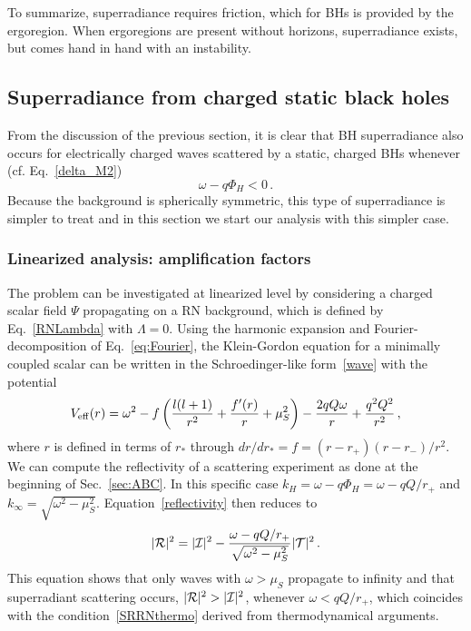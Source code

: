 \documentclass[11pt]{article}
\numberwithin{equation}{section} %
\begin{document}
To summarize, superradiance requires friction, which for BHs is provided by the ergoregion. When ergoregions are present without horizons, superradiance exists, but comes hand in hand with an instability.
\subsection{Superradiance from charged static black holes}\label{sec:superradiance_charged}
From the discussion of the previous section, it is clear that BH superradiance also occurs for electrically charged waves scattered by a static, charged BHs whenever (cf. Eq.~\eqref{delta_M2})
%
\begin{equation}
\omega-q\Phi_H<0\,. \label{SRRNthermo}
\end{equation}
%
Because the background is spherically symmetric, this type of superradiance is simpler to treat and in this section we start our analysis with this simpler case.
%
\subsubsection{Linearized analysis: amplification factors}
The problem can be investigated at linearized level by considering a charged scalar field $\Psi$ propagating on a RN 
background, which is defined by Eq.~\eqref{RNLambda} with $\Lambda=0$. Using the harmonic expansion and 
Fourier-decomposition of Eq.~\eqref{eq:Fourier}, the Klein-Gordon equation for a minimally coupled scalar can be written 
in the Schroedinger-like form~\eqref{wave} with the potential
%
\begin{equation}
V_{\rm eff}(r)=\omega^2-f\left(\frac{l(l+1)}{r^2}+\frac{f'(r)}{r}+\mu_S^2\right)-\frac{2qQ\omega}{r}+\frac{q^2Q^2}{r^2}\,,\label{VRN}
\end{equation}
%
where $r$ is defined in terms of $r_*$ through $dr/dr_*=f=(r-r_+)(r-r_-)/r^2$.
We can compute the reflectivity of a scattering experiment as done at the beginning of Sec.~\ref{sec:ABC}. In this specific case $k_H=\omega-q\Phi_H=\omega-qQ/r_+$ and $k_\infty=\sqrt{\omega^2-\mu_S^2}$. Equation~\eqref{reflectivity} then reduces to
\begin{equation}
 |{\cal R}|^2=|{\cal I}|^2-\frac{\omega-qQ/r_+}{\sqrt{\omega^2-\mu_S^2}}|{\cal T}|^2\,.\label{reflectivityRN}
\end{equation}
This equation shows that only waves with $\omega>\mu_S$ propagate to infinity and that superradiant scattering occurs, $|{\cal R}|^2>|{\cal I}|^2$, whenever $\omega<qQ/r_+$, which coincides with the condition~\eqref{SRRNthermo} derived from thermodynamical arguments. 
\end{document}
